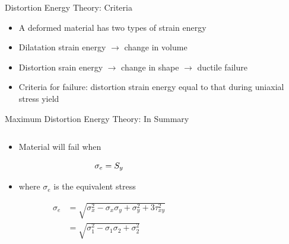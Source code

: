 \documentclass[10pt, svgnames]{beamer}
\begin{document}
\begin{frame}[label={sec:org77fbb56}]{Distortion Energy Theory: Criteria}
\begin{itemize}
\item A deformed material has two types of strain energy
\item Dilatation strain energy \(\rightarrow\) change in volume
\item Distortion srain energy \(\rightarrow\) change in shape \(\rightarrow\) ductile failure
\item Criteria for failure: distortion strain energy equal to that during uniaxial stress yield
\end{itemize}
\end{frame}


\begin{frame}[label={sec:org54b6376}]{Maximum Distortion Energy Theory: In Summary}
\begin{columns}
\begin{column}{0.4\columnwidth}
\begin{itemize}
\item Material will fail when
\end{itemize}
\begin{equation*}
\scalebox{1}{$\sigma_e = S_y$}
\end{equation*}
\begin{itemize}
\item where \(\sigma_e\) is the equivalent stress
\end{itemize}
\begin{align*}

\sigma_e &= \sqrt{\sigma_x^2 - \sigma_x\sigma_y + \sigma_y^2 + 3\tau_{xy}^2} \\
&= \sqrt{\sigma_1^2 - \sigma_1\sigma_2 + \sigma_2^2}
\end{align*}
\end{column}

\begin{column}{0.6\columnwidth}
\end{column}
\end{columns}
\end{frame}
\end{document}

